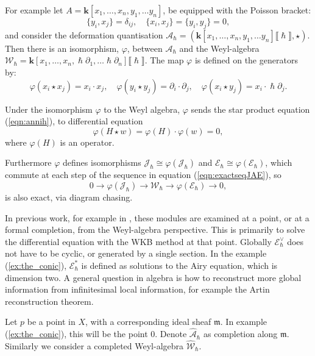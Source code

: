     \begin{ex} 
    For example let \(A=\mathbf{k}[x_1,\dots,x_n,y_1,\dots y_n]\), be equipped with the Poisson bracket:  \[\{y_i,x_j\} = \delta_{ij}, \quad  \{x_i,x_j \} = \{ y_i,y_j\} = 0,\] and consider the deformation quantisation \( \mathcal{A}_{\hslash} = (\mathbf{k}[x_1,\dots,x_n,y_1,\dots y_n]\lBrack\hslash \rBrack, \star )\).
    Then there is an isomorphism, \( \varphi\), between \( \mathcal{A}_{\hslash}\) and the Weyl-algebra \( \mathcal{W}_{\hslash} = \mathbf{k} [x_1, \dots, x_n , \hslash \partial_1 , \dots \hslash \partial_n ] \lBrack \hslash \rBrack\). The map \( \varphi\) is defined on the generators by:
    \[ \varphi(x_i \star x_j) = x_i \cdot  x_j, \quad \varphi( y_i \star y_j) = \partial_i \cdot \partial_j, \quad \varphi(x_i \star y_j ) = x_i \cdot \hslash \partial_j. \]
    \end{ex}
    
    Under the isomorphism \( \varphi\) to the Weyl algebra, \( \varphi\) sends the star product equation (\ref{eqn:annih}), to differential equation
    \[ \varphi(H \star w ) = \varphi(H) \cdot \varphi(w) = 0,\]
    where \( \varphi(H)\) is an operator. 
    
    Furthermore \( \varphi\) defines isomorphisms \(  \mathcal{J}_{\hslash}\cong \varphi(\mathcal{J}_{\hslash})\) and \( \mathcal{E}_{\hslash} \cong \varphi ( \mathcal{E}_{\hslash})\), which commute at each step of the sequence in equation (\ref{eqn:exactseqJAE}), so 
    \[ 0 \rightarrow \varphi(\mathcal{J}_{\hslash}) \rightarrow \mathcal{W}_{\hslash} \rightarrow \varphi(\mathcal{E}_{\hslash}) \rightarrow 0, \]
    is also exact, via diagram chasing. 
    
    In previous work, for example in \cite{norbury_quant, ks_airy}, these modules are examined at a point, or at a formal completion, from the Weyl-algebra perspective. This is primarily to solve the differential equation with the WKB method at that point.
    Globally \( \mathcal{E}_{\hslash}^{\vee}\) does not have to be cyclic, or generated by a single section. In the example (\ref{ex:the_conic}), \( \mathcal{E}_{\hslash}^*\) is defined as solutions to the Airy equation, which is dimension two. A general question in algebra is how to reconstruct more global information from infinitesimal local information, for example the Artin reconstruction theorem.
    
    Let \(p\) be a point in \(X\), with a corresponding ideal sheaf \( \mathfrak{m}\). In example (\ref{ex:the_conic}), this will be the point \(0\). Denote \( \widehat{\mathcal{A}}_{\hslash}\) as completion along \( \mathfrak{m}\). Similarly we consider a completed Weyl-algebra \( \widehat{\mathcal{W}}_{\hslash}\). 
    
